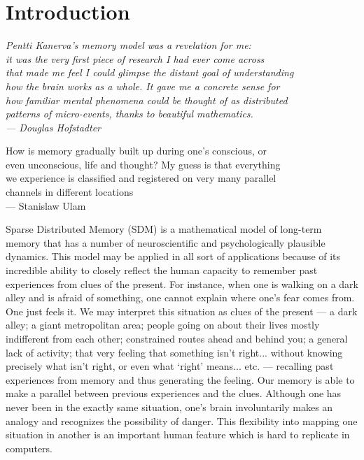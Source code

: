 
\chapter{Introduction}

\bigskip

\begin{flushright}{\slshape
    {Pentti Kanerva's memory model was a revelation for me: \\
    it was the very first piece of research I had ever come across\\
    that made me feel I could glimpse the distant goal of understanding \\
    how the brain works as a whole. It gave me a concrete sense for\\
    how familiar mental phenomena could be thought of as distributed\\
    patterns of micro-events, thanks to beautiful mathematics.} \\ \medskip
    --- Douglas Hofstadter
    \bigskip
    \bigskip

    {How is memory gradually built up during one's conscious, or\\
    even unconscious, life and thought?  My guess is that everything \\
    we experience is classified and registered on very many parallel \\
    channels in different locations} \\ \medskip
    --- Stanislaw Ulam}
\end{flushright}
\bigskip
\bigskip




Sparse Distributed Memory (SDM) \citep{Kanerva1988} is a mathematical model of long-term memory that has a number of neuroscientific and psychologically plausible dynamics. This model may be applied in all sort of applications because of its incredible ability to closely reflect the human capacity to remember past experiences from clues of the present. For instance, when one is walking on a dark alley and is afraid of something, one cannot explain where one's fear comes from. One just feels it. We may interpret this situation as clues of the present --- a dark alley; a giant metropolitan area; people going on about their lives mostly indifferent from each other; constrained routes ahead and behind you; a general lack of activity; that very feeling that something isn't right... without knowing precisely what isn't right, or even what `right' means... etc. --- recalling past experiences from memory and thus generating the feeling. Our memory is able to make a parallel between previous experiences and the clues. Although one has never been in the exactly same situation, one's brain involuntarily makes an analogy and recognizes the possibility of danger. This flexibility into mapping one situation in another is an important human feature which is hard to replicate in computers.

